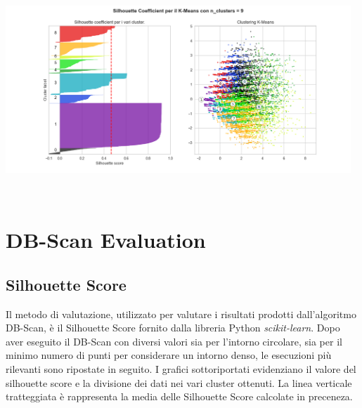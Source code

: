 \documentclass[a4paper, 10pt]{report}
\begin{document}
                \begin{center}
                    \includegraphics[width=13cm, height=8cm]{evaluation/silhouette_9}\\
                \end{center}


        \section{DB-Scan Evaluation}\label{sec:dbscan-evaluation}
            \subsection{Silhouette Score}
                Il metodo di valutazione, utilizzato per valutare i risultati prodotti dall'algoritmo DB-Scan, è il Silhouette Score
                fornito dalla libreria Python \textit{scikit-learn}. Dopo aver eseguito il DB-Scan con diversi valori sia per l'intorno
                circolare, sia per il minimo numero di punti per considerare un intorno denso, le esecuzioni più rilevanti sono ripostate
                in seguito. I grafici sottoriportati evidenziano il valore del silhouette score e la divisione dei dati nei vari cluster
                ottenuti. La linea verticale tratteggiata è rappresenta la media delle Silhouette Score calcolate in preceneza.
\end{document}
